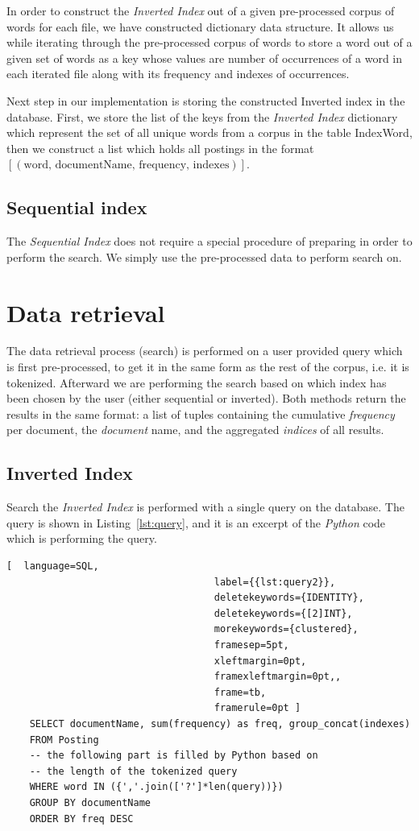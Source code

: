 \documentclass{article}
\begin{document}
	In order to construct the \textit{Inverted Index} out of a given pre-processed corpus of words for each file, we have constructed dictionary data structure. It allows us while iterating through the pre-processed corpus of words to store a word out of a given set of words as a key whose values are number of occurrences of a word in each iterated file along with its frequency and indexes of occurrences.
	
	Next step in our implementation is storing the constructed Inverted index in the database. First, we store the list of the keys from the \textit{Inverted Index} dictionary which represent the set of all unique words from a corpus in the table IndexWord, then we construct a list which holds all postings in the format \newline \texttt{$[(\mbox{word, documentName, frequency, indexes})]$}.
	
	
	\subsection{Sequential index}
	
	The \textit{Sequential Index} does not require a special procedure of preparing in order to perform the search. We simply use the pre-processed data to perform search on.
	
	\section{Data retrieval}
	The data retrieval process (search) is performed on a user provided query which is first pre-processed, to get it in the same form as the rest of the corpus, i.e. it is tokenized. Afterward we are performing the search based on which index has been chosen by the user (either sequential or inverted). Both methods return the results in the same format: a list of tuples containing the cumulative \textit{frequency} per document, the \textit{document} name, and the aggregated \textit{indices} of all results.
	
	\subsection{Inverted Index}
	Search the \textit{Inverted Index} is performed with a single query on the database. The query is shown in Listing~\ref{lst:query}, and it is an excerpt of the \textit{Python} code which is performing the query.
	
	\begin{lstlisting}[  language=SQL,
									label={{lst:query2}},
									deletekeywords={IDENTITY},
									deletekeywords={[2]INT},
									morekeywords={clustered},
									framesep=5pt,
									xleftmargin=0pt,
									framexleftmargin=0pt,,
									frame=tb,
									framerule=0pt ]
	SELECT documentName, sum(frequency) as freq, group_concat(indexes)
	FROM Posting
	-- the following part is filled by Python based on
	-- the length of the tokenized query
	WHERE word IN ({','.join(['?']*len(query))})
	GROUP BY documentName
	ORDER BY freq DESC
	\end{lstlisting}
	
\end{document}
